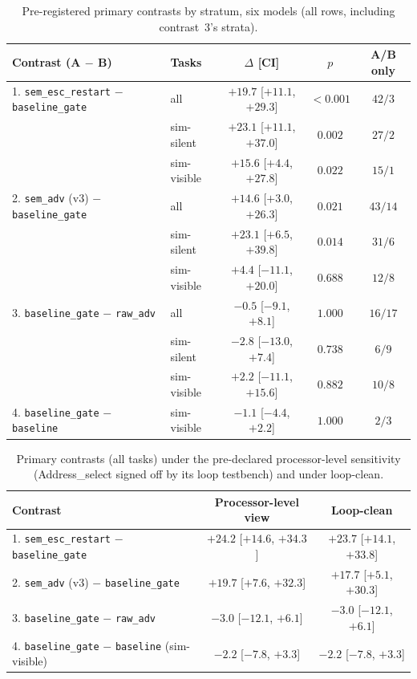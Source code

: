 \documentclass[11pt]{article}
\newcommand{\cond}[1]{\texttt{#1}}
\begin{document}
\begin{table}[htbp]
\centering
\caption{Pre-registered primary contrasts by stratum, six models (all rows,
including contrast~3's strata).}
\label{tab:s-p3-primary}
\small
\begin{tabular}{@{}l l c c c@{}}
\toprule
\textbf{Contrast (A $-$ B)} & \textbf{Tasks} & \textbf{$\Delta$ [CI]} & \textbf{$p$} & \textbf{A/B only} \\
\midrule
1. \cond{sem\_esc\_restart} $-$ \cond{baseline\_gate} & all  & $+19.7$ [$+11.1$, $+29.3$] & ${<}0.001$ & $42/3$ \\
   & sim-silent  & $+23.1$ [$+11.1$, $+37.0$] & $0.002$ & $27/2$ \\
   & sim-visible & $+15.6$ [$+4.4$, $+27.8$]  & $0.022$ & $15/1$ \\
2. \cond{sem\_adv} (v3) $-$ \cond{baseline\_gate} & all & $+14.6$ [$+3.0$, $+26.3$] & $0.021$ & $43/14$ \\
   & sim-silent  & $+23.1$ [$+6.5$, $+39.8$]  & $0.014$ & $31/6$ \\
   & sim-visible & $+4.4$ [$-11.1$, $+20.0$]  & $0.688$ & $12/8$ \\
3. \cond{baseline\_gate} $-$ \cond{raw\_adv} & all & $-0.5$ [$-9.1$, $+8.1$] & $1.000$ & $16/17$ \\
   & sim-silent  & $-2.8$ [$-13.0$, $+7.4$]   & $0.738$ & $6/9$ \\
   & sim-visible & $+2.2$ [$-11.1$, $+15.6$]  & $0.882$ & $10/8$ \\
4. \cond{baseline\_gate} $-$ \cond{baseline} & sim-visible & $-1.1$ [$-4.4$, $+2.2$] & $1.000$ & $2/3$ \\
\bottomrule
\end{tabular}
\end{table}

\begin{table}[htbp]
\centering
\caption{Primary contrasts (all tasks) under the pre-declared processor-level
sensitivity (Address\_select signed off by its loop testbench) and under
loop-clean.}
\label{tab:s-p3-sens}
\small
\begin{tabular}{@{}l c c@{}}
\toprule
\textbf{Contrast} & \textbf{Processor-level view} & \textbf{Loop-clean} \\
\midrule
1. \cond{sem\_esc\_restart} $-$ \cond{baseline\_gate} & $+24.2$ [$+14.6$, $+34.3$] & $+23.7$ [$+14.1$, $+33.8$] \\
2. \cond{sem\_adv} (v3) $-$ \cond{baseline\_gate}     & $+19.7$ [$+7.6$, $+32.3$]  & $+17.7$ [$+5.1$, $+30.3$] \\
3. \cond{baseline\_gate} $-$ \cond{raw\_adv}          & $-3.0$ [$-12.1$, $+6.1$]   & $-3.0$ [$-12.1$, $+6.1$] \\
4. \cond{baseline\_gate} $-$ \cond{baseline} (sim-visible) & $-2.2$ [$-7.8$, $+3.3$] & $-2.2$ [$-7.8$, $+3.3$] \\
\bottomrule
\end{tabular}
\end{table}
\end{document}
